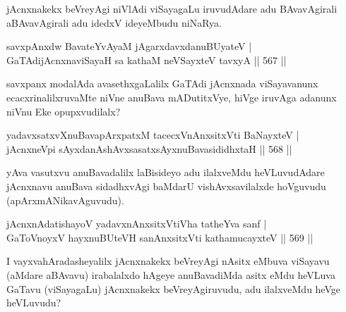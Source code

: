 \begin{artha}
jAcnxnakekx beVreyAgi niVlAdi viSayagaLu iruvudAdare adu BAvavAgirali aBAvavAgirali adu idedxV ideyeMbudu niNaRya.
\end{artha}


\begin{shl}
savxpAnxdw BavateYvAyaM jAgarxdavxdanuBUyateV | \\
GaTAdijAcnxnaviSayaH sa kathaM neVSayxteV tavxyA \hfill ||  567 ||  
\end{shl}

\begin{artha}
savxpanx modalAda avasethxgaLalilx GaTAdi jAcnxnada viSayavanunx ecacxrinalilxruvaMte niVne anuBava mADutitxVye, hiVge iruvAga adanunx niVnu Eke opupxvudilalx?
\end{artha}


\begin{shl}
yadavxsatxvXnuBavapArxpatxM tacecxVnAnxsitxVti BaNayxteV | \\
jAcnxneV\s pi sAyxdanAshAvxsasatxsAyxnuBavasididhxtaH \hfill||  568 ||  
\end{shl}

\begin{artha}
yAva vasutxvu anuBavadalilx laBisideyo adu ilalxveMdu heVLuvudAdare jAcnxnavu anuBava sidadhxvAgi baMdarU vishAvxsavilalxde hoVguvudu (apArxmANikavAguvudu).
\end{artha}


\begin{shl}
jAcnxnAdati\footnotemark[1]shayoV yadavxnAnxsitxVtiVha tatheYva sanf | \\
GaToV\s noyxV hayxnuBUteVH sanAnxsitxVti kathamucayxteV \hfill||  569 ||  
\end{shl}

\begin{artha}
I vayxvahAradasheyalilx jAcnxnakekx beVreyAgi nAsitx eMbuva viSayavu (aMdare aBAvavu) irabalalxdo hAgeye anuBavadiMda asitx eMdu heVLuva GaTavu (viSayagaLu) jAcnxnakekx beVreyAgiruvudu, adu ilalxveMdu heVge heVLuvudu?
\end{artha}

